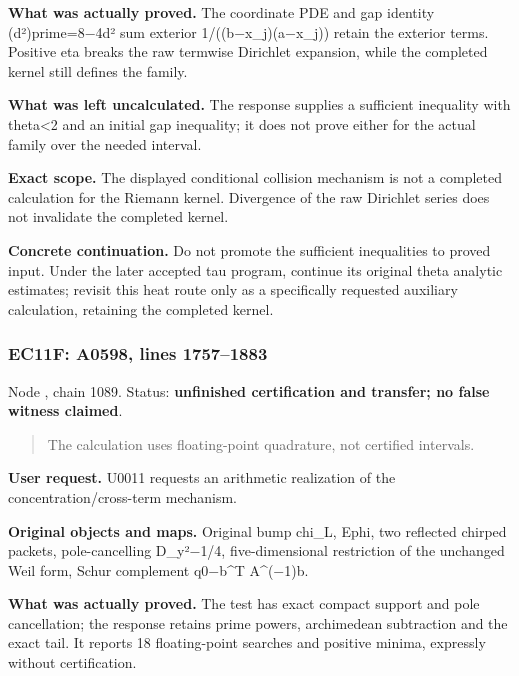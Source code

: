 \textbf{What was actually proved.} The coordinate PDE and gap identity
(d²)prime=8\allowbreak{}\ensuremath{−}\allowbreak{}4d² sum exterior
1/((b\allowbreak{}\ensuremath{−}\allowbreak{}x\_j)(a\allowbreak{}\ensuremath{−}\allowbreak{}x\_j))
retain the exterior terms. Positive eta breaks the raw termwise
Dirichlet expansion, while the completed kernel still defines the
family.

\textbf{What was left uncalculated.} The response supplies a sufficient
inequality with theta\textless2 and an initial gap inequality; it does
not prove either for the actual family over the needed interval.

\textbf{Exact scope.} The displayed conditional collision mechanism is
not a completed calculation for the Riemann kernel. Divergence of the
raw Dirichlet series does not invalidate the completed kernel.

\textbf{Concrete continuation.} Do not promote the sufficient
inequalities to proved input. Under the later accepted tau program,
continue its original theta analytic estimates; revisit this heat route
only as a specifically requested auxiliary calculation, retaining the
completed kernel.

\subsubsection{EC11F: A0598, lines
1757--1883}\label{TranscriptLedgerStage:ec11f-a0598-lines-17571883}

Node \protect{}, chain 1089.
Status: \textbf{unfinished certification and transfer; no false witness
claimed}.

\begin{quote}
The calculation uses floating-point quadrature, not certified intervals.
\end{quote}

\textbf{User request.} U0011 requests an arithmetic realization of the
concentration/cross-term mechanism.

\textbf{Original objects and maps.} Original bump chi\_L, Ephi, two
reflected chirped packets, pole-cancelling
D\_y²\allowbreak{}\ensuremath{−}\allowbreak{}1/4, five-dimensional
restriction of the unchanged Weil form, Schur complement
q0\allowbreak{}\ensuremath{−}\allowbreak{}b\textasciicircum{}T
A\textasciicircum{}(\allowbreak{}\ensuremath{−}\allowbreak{}1)b.

\textbf{What was actually proved.} The test has exact compact support
and pole cancellation; the response retains prime powers, archimedean
subtraction and the exact tail. It reports 18 floating-point searches
and positive minima, expressly without certification.

